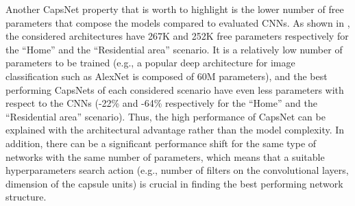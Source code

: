 Another CapsNet property that is worth to highlight is the lower number of free parameters that compose the models compared to evaluated CNNs.
As shown in , the considered architectures have 267K and 252K free parameters respectively for the ``Home'' and the ``Residential area'' scenario. It is a relatively low number of parameters to be trained (e.g., a popular deep architecture for image classification such as AlexNet \cite{krizhevsky2012imagenet} is composed of 60M parameters), and the best performing CapsNets of each considered scenario have even less parameters with respect to the CNNs (-22\% and -64\%  respectively for the ``Home'' and the ``Residential area'' scenario). Thus, the high performance of CapsNet can be explained with the architectural advantage rather than the model complexity. In addition, there can be a significant performance shift for the same type of networks with the same number of parameters,
which means that a suitable hyperparameters search action (e.g., number of filters on the convolutional layers, dimension of the capsule units) is crucial in finding the best performing network structure.

